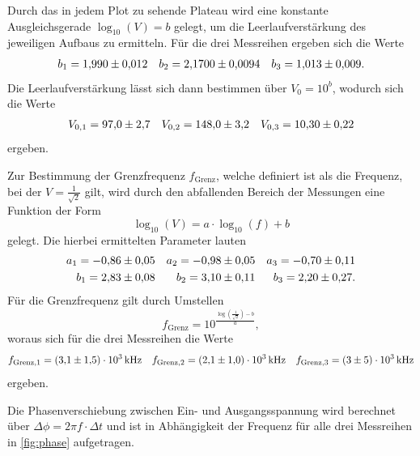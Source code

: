 Durch das in jedem Plot zu sehende Plateau wird eine konstante Ausgleichsgerade $\log_{10} (V) = b$ gelegt, um die Leerlaufverstärkung des jeweiligen Aufbaus zu ermitteln. Für die drei Messreihen ergeben sich die Werte
\begin{align*}
  b_1 = \num{1.99 \pm 0.012} && b_2 = \num{2.170 \pm 0.0094} && b_3 = \num{1.013 \pm 0.009}.
\end{align*}
Die Leerlaufverstärkung lässt sich dann bestimmen über $V_0 = 10^{b}$, wodurch sich die Werte
\begin{align*}
  V_{0,1} = \num{97 \pm 2.7} && V_{0,2} = \num{148 \pm 3.2} && V_{0,3} = \num{10.3 \pm 0.22}
\end{align*}
ergeben.

Zur Bestimmung der Grenzfrequenz $f_\mathrm{Grenz}$, welche definiert ist als die Frequenz, bei der $V = \frac{1}{\sqrt{2}}$ gilt, wird durch den abfallenden Bereich der Messungen eine Funktion der Form
\begin{equation*}
  \log_{10} (V) = a \cdot \log_{10} (f) + b
\end{equation*}
gelegt. Die hierbei ermittelten Parameter lauten
\begin{align*}
  a_1 = \num{-0.86 \pm 0.05} && a_2 = \num{-0.98 \pm 0.05} && a_3 = \num{-0.7 \pm 0.11}\\
  b_1 = \num{2.83 \pm 0.08} && b_2 = \num{3.1 \pm 0.11} && b_3 = \num{2.2 \pm 0.27}.
\end{align*}
Für die Grenzfrequenz gilt durch Umstellen
\begin{equation*}
  f_\mathrm{Grenz} = 10^{\frac{\log (\frac{1}{\sqrt{2}}) - b}{a}},
\end{equation*}
woraus sich für die drei Messreihen die Werte
\begin{align*}
  f_{\mathrm{Grenz},1} = \SI{3.1 \pm 1.5 e3}{\kilo\hertz} && f_{\mathrm{Grenz},2} = \SI{2.1 \pm 1.0 e3}{\kilo\hertz} && f_{\mathrm{Grenz},3} = \SI{3 \pm 5 e3}{\kilo\hertz}
\end{align*}
ergeben.

Die Phasenverschiebung zwischen Ein- und Ausgangsspannung wird berechnet über $\Delta \phi = 2 \pi f \cdot \Delta t$ und ist in Abhängigkeit der Frequenz für alle drei Messreihen in \autoref{fig:phase} aufgetragen.


